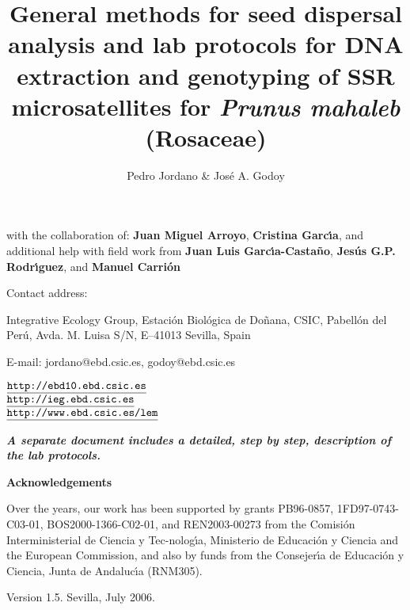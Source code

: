\documentclass[a4paper,12pt]{article}
\newcommand{\tab}{\hspace{5mm}}
\begin{document}
\title{General methods for seed dispersal analysis and lab protocols 
for DNA extraction and genotyping of SSR microsatellites for 
\textit{Prunus mahaleb} (Rosaceae)}

\author{Pedro Jordano \& Jos\'e A. Godoy}

\maketitle


\begin{center}
{\small with the collaboration of: \textbf{Juan Miguel Arroyo}}{\small , \textbf{Cristina Garc\'{\i}a}}{\small , and additional help with field work from \textbf{Juan Luis Garc\'{\i}a-Casta\~{n}o}}{\small , \textbf{Jes\'{u}s G.P. Rodr\'{\i}guez}}{\small , and \textbf{Manuel Carri\'{o}n}}


\end{center}
\tab Contact address:
\begin{center}
Integrative Ecology Group, Estaci\'{o}n Biol\'{o}gica de Do\~{n}ana, 
CSIC, Pabell\'{o}n del Per\'{u}, Avda. M. Luisa S/N, E--41013 Sevilla, 
Spain

E-mail: jordano@ebd.csic.es, godoy@ebd.csic.es

\vspace{0.5cm}
$\texttt{\underline {http://ebd10.ebd.csic.es}} $\\
$\texttt{\underline {http://ieg.ebd.csic.es}}$\\
$\texttt{\underline {http://www.ebd.csic.es/lem}}$

\vspace{1cm}
\textbf{\textit{A separate document includes a detailed, step by step, 
description of the lab protocols.}}

\end{center}

\begin{center}
\textbf{{\small Acknowledgements}}
\end{center}

{\footnotesize Over the years, our work has been supported by grants PB96-0857, 1FD97-0743-C03-01, BOS2000-1366-C02-01, and REN2003-00273 from the Comisi\'{o}n Interministerial de Ciencia y Tec-nolog\'{\i}a, Ministerio de Educaci\'{o}n y Ciencia and the European Commission, and also by funds from the Consejer\'{\i}a de Educaci\'{o}n y Ciencia, Junta de Andaluc\'{\i}a (RNM305).}

\begin{center}
Version 1.5. Sevilla, July 2006.
\end{center}
\end{document}
